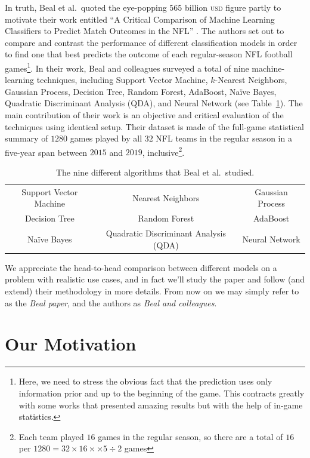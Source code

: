 \documentclass[10pt]{article}
\begin{document}
In truth, Beal et al.~quoted the eye-popping $565$ billion \textsc{usd}
figure partly to motivate their work entitled
``A Critical Comparison of Machine Learning Classifiers to Predict
Match Outcomes in the NFL'' \cite{BeNo2020}.
The authors set out to compare and contrast the performance of different
classification models in order to find one that best predicts the outcome 
of each regular-season NFL football games\footnote{Here, we need to stress the
obvious fact that the prediction uses only information 
prior and up to the beginning of the game. This contracts greatly with
some works that presented amazing results but with the help of
in-game statistics.}.
In their work, Beal and colleagues surveyed
a total of nine machine-learning techniques, including
Support Vector Machine,
$k$-Nearest Neighbors,
Gaussian Process,
Decision Tree,
Random Forest,
AdaBoost,
Na\"ive Bayes, Quadratic Discriminant Analysis (QDA), and Neural Network
(see Table~\ref{table:9}).
The main contribution of their work is an objective and critical evaluation of
the techniques using identical setup. Their dataset is made of the full-game
statistical summary of $1280$
games played by all $32$ NFL teams in the regular season in a
five-year span between $2015$ and $2019$, inclusive\footnote{Each team played
$16$ games in the regular season, so there are a total
of $16$ per
$1280 = 32 \times 16 \times \times 5 \div 2$ games}.

\begin{table}[htbp]
\centering
\begin{tabular}{|c|c|c|}
\hline
Support Vector Machine &
Nearest Neighbors &
Gaussian Process \\
Decision Tree &
Random Forest &
AdaBoost \\ 
Na\"ive Bayes & Quadratic Discriminant Analysis (QDA) & Neural Network \\
\hline
\end{tabular}
\caption{The nine different algorithms that Beal et al.~studied.}
\label{table:9}
\end{table}

We appreciate the head-to-head comparison between different models on
a problem with realistic use cases, and in fact we'll study the paper 
and follow (and extend) their methodology in more details. From now on
we may simply refer to \cite{BeNo2020}
as the {\em Beal paper}, and the authors as
{\em Beal and colleagues}.

\section{Our Motivation}
\end{document}
